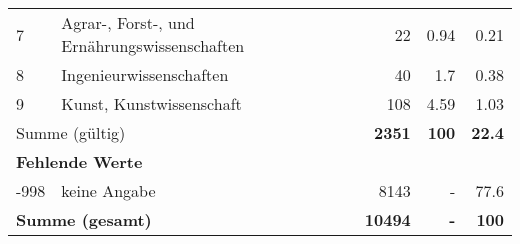 \begin{longtable}{lXrrr}
     7 &
     \multicolumn{1}{X}{ Agrar-, Forst-, und Ernährungswissenschaften   } &


       \num{22} &
       \num[round-mode=places,round-precision=2]{0.94} &
         \num[round-mode=places,round-precision=2]{0.21} \\

     8 &
     \multicolumn{1}{X}{ Ingenieurwissenschaften   } &


       \num{40} &
       \num[round-mode=places,round-precision=2]{1.7} &
         \num[round-mode=places,round-precision=2]{0.38} \\

     9 &
     \multicolumn{1}{X}{ Kunst, Kunstwissenschaft   } &


       \num{108} &
       \num[round-mode=places,round-precision=2]{4.59} &
         \num[round-mode=places,round-precision=2]{1.03} \\
     \midrule
     \multicolumn{2}{l}{Summe (gültig)} &
       \textbf{\num{2351}} &
     \textbf{\num{100}} &
       \textbf{\num[round-mode=places,round-precision=2]{22.4}} \\
     \multicolumn{5}{l}{\textbf{Fehlende Werte}}\\
       -998 &
       keine Angabe &
         \num{8143} &
        - &
         \num[round-mode=places,round-precision=2]{77.6} \\
     \midrule
     \multicolumn{2}{l}{\textbf{Summe (gesamt)}} &
          \textbf{\num{10494}} &
        \textbf{-} &
        \textbf{\num{100}} \\
     \bottomrule
     \end{longtable}
     
